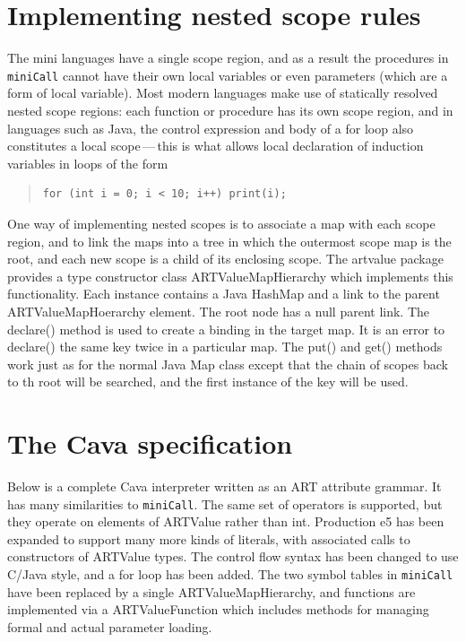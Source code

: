 \section{Implementing nested scope rules}
The mini languages have a single scope region, and as a result the procedures in {\tt miniCall} cannot have their own local variables or even parameters (which are a form of local variable). Most modern languages make use of statically resolved nested scope regions: each function or procedure has its own scope region, and in languages such as Java, the control expression and body of a {\sf for} loop also constitutes a local scope\,---\,this is what allows local declaration of induction variables in loops of the form
\begin{quote}
\begin{verbatim}
for (int i = 0; i < 10; i++) print(i);
\end{verbatim}
\end{quote}
One way of implementing nested scopes is to associate a map with each scope region, and to link the maps into a tree in which the outermost scope map is the root, and each new scope is a child of its enclosing scope. The {\sf artvalue} package provides a type constructor class {\sf ARTValueMapHierarchy} which implements this functionality. Each instance contains a Java {\sf HashMap} and a link to the parent {\sf ARTValueMapHoerarchy} element. The root node has a {\sf null} parent link. The {\sf declare()} method is used to create a binding in the target map. It is an error to {\sf declare()} the same key twice in a particular map. The {\sf put()} and {\sf get()} methods work just as for the normal Java {\sf Map} class except that the chain of scopes back to th root will be searched, and the first instance of the key will be used.

\section{The Cava specification}

Below is a complete Cava interpreter written as an ART attribute grammar. It has many similarities to {\tt miniCall}. The same set of operators is supported, but they operate on elements of {\sf ARTValue} rather than {\sf int}. Production {\sf e5} has been expanded to support many more kinds of literals, with associated calls to constructors of {\sf ARTValue} types. The control flow syntax has been changed to use C/Java style, and a {\sf for} loop has been added. The two symbol tables in {\tt miniCall} have been replaced by a single {\sf ARTValueMapHierarchy}, and functions are implemented via a {\sf ARTValueFunction} which includes methods for managing formal and actual parameter loading.

